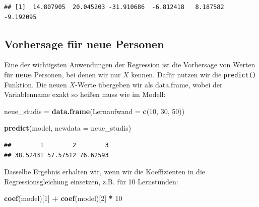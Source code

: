 \documentclass[
]{book}
\newenvironment{Shaded}{\begin{snugshade}}{\end{snugshade}}
\newcommand{\AttributeTok}[1]{\textcolor[rgb]{0.13,0.29,0.53}{#1}}
\newcommand{\DecValTok}[1]{\textcolor[rgb]{0.00,0.00,0.81}{#1}}
\newcommand{\FunctionTok}[1]{\textcolor[rgb]{0.13,0.29,0.53}{\textbf{#1}}}
\newcommand{\NormalTok}[1]{#1}
\newcommand{\OtherTok}[1]{\textcolor[rgb]{0.56,0.35,0.01}{#1}}
\newcommand{\SpecialCharTok}[1]{\textcolor[rgb]{0.81,0.36,0.00}{\textbf{#1}}}
\begin{document}
\begin{Shaded}
\end{Shaded}

\begin{verbatim}
## [1]  14.807905  20.045203 -31.910686  -6.812418   8.187582  -9.192095
\end{verbatim}

\subsection{Vorhersage für neue Personen}\label{vorhersage-fuxfcr-neue-personen}

Eine der wichtigsten Anwendungen der Regression ist die Vorhersage von Werten für \textbf{neue} Personen, bei denen wir nur \(X\) kennen. Dafür nutzen wir die \texttt{predict()} Funktion. Die neuen \(X\)-Werte übergeben wir als data.frame, wobei der Variablenname exakt so heißen muss wie im Modell:

\begin{Shaded}
\begin{Highlighting}[]
\NormalTok{neue\_studis }\OtherTok{=} \FunctionTok{data.frame}\NormalTok{(}\AttributeTok{Lernaufwand =} \FunctionTok{c}\NormalTok{(}\DecValTok{10}\NormalTok{, }\DecValTok{30}\NormalTok{, }\DecValTok{50}\NormalTok{))}

\FunctionTok{predict}\NormalTok{(model, }\AttributeTok{newdata =}\NormalTok{ neue\_studis)}
\end{Highlighting}
\end{Shaded}

\begin{verbatim}
##        1        2        3 
## 38.52431 57.57512 76.62593
\end{verbatim}

Dasselbe Ergebnis erhalten wir, wenn wir die Koeffizienten in die Regressionsgleichung einsetzen, z.B. für 10 Lernstunden:

\begin{Shaded}
\begin{Highlighting}[]
\FunctionTok{coef}\NormalTok{(model)[}\DecValTok{1}\NormalTok{] }\SpecialCharTok{+} \FunctionTok{coef}\NormalTok{(model)[}\DecValTok{2}\NormalTok{] }\SpecialCharTok{*} \DecValTok{10}
\end{Highlighting}
\end{Shaded}
\end{document}
